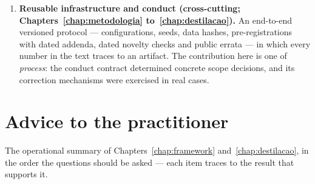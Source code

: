 \begin{enumerate}
\begin{enumerate}
    diagnostic, test a strong native,
    and
    distill only the genuine advantage that survives --- a
    precondition measurable by a single OOF labeling, minutes to a
    few hours depending on pool and teacher (the gate was verified
    in its oracle version; the OOF version was not evaluated). It is
    the operational form of the answer to RQ3.
  \end{enumerate}
  \item \textbf{Reusable infrastructure and conduct (cross-cutting;
    Chapters~\ref{chap:metodologia} to~\ref{chap:destilacao}).} An
    end-to-end versioned protocol --- configurations, seeds, data
    hashes, pre-registrations with dated addenda, dated novelty
    checks and public errata --- in which every number in the text
    traces to an artifact. The contribution here is one of
    \emph{process}: the conduct contract determined concrete scope
    decisions, and its correction mechanisms were exercised in real
    cases.
\end{enumerate}

\section{Advice to the practitioner}
\label{sec:conc-conselhos}

The operational summary of Chapters~\ref{chap:framework}
and~\ref{chap:destilacao}, in the order the questions should be
asked --- each item traces to the result that supports it.

